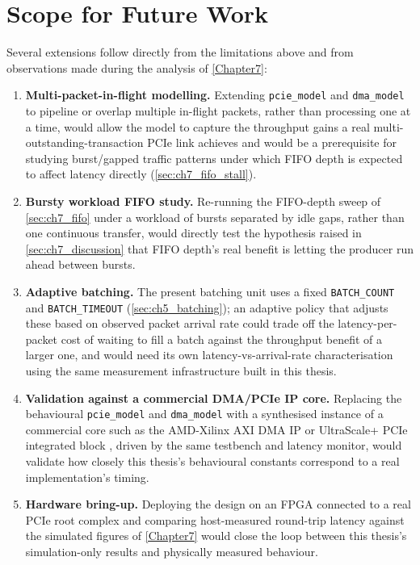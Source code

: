 \section{Scope for Future Work}
\label{sec:ch8_future}

Several extensions follow directly from the limitations above and from observations made during the analysis of \autoref{Chapter7}:

\begin{enumerate}
    \item \textbf{Multi-packet-in-flight modelling.} Extending \texttt{pcie\_model} and \texttt{dma\_model} to pipeline or overlap multiple in-flight packets, rather than processing one at a time, would allow the model to capture the throughput gains a real multi-outstanding-transaction PCIe link achieves and would be a prerequisite for studying burst/gapped traffic patterns under which FIFO depth is expected to affect latency directly (\autoref{sec:ch7_fifo_stall}).
    \item \textbf{Bursty workload FIFO study.} Re-running the FIFO-depth sweep of \autoref{sec:ch7_fifo} under a workload of bursts separated by idle gaps, rather than one continuous transfer, would directly test the hypothesis raised in \autoref{sec:ch7_discussion} that FIFO depth's real benefit is letting the producer run ahead between bursts.
    \item \textbf{Adaptive batching.} The present batching unit uses a fixed \texttt{BATCH\_COUNT} and \texttt{BATCH\_TIMEOUT} (\autoref{sec:ch5_batching}); an adaptive policy that adjusts these based on observed packet arrival rate could trade off the latency-per-packet cost of waiting to fill a batch against the throughput benefit of a larger one, and would need its own latency-vs-arrival-rate characterisation using the same measurement infrastructure built in this thesis.
    \item \textbf{Validation against a commercial DMA/PCIe IP core.} Replacing the behavioural \texttt{pcie\_model} and \texttt{dma\_model} with a synthesised instance of a commercial core such as the AMD-Xilinx AXI DMA IP or UltraScale+ PCIe integrated block \cite{xilinx2021axidma, xilinx2021pcieintblock}, driven by the same testbench and latency monitor, would validate how closely this thesis's behavioural constants correspond to a real implementation's timing.
    \item \textbf{Hardware bring-up.} Deploying the design on an FPGA connected to a real PCIe root complex and comparing host-measured round-trip latency against the simulated figures of \autoref{Chapter7} would close the loop between this thesis's simulation-only results and physically measured behaviour.
\end{enumerate}
